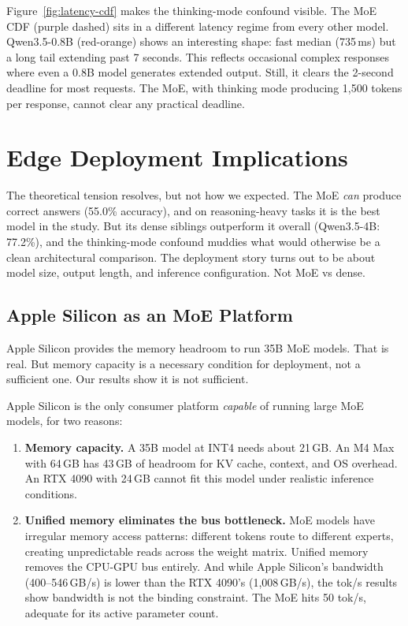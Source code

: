 \documentclass[11pt]{article}
\begin{document}
Figure~\ref{fig:latency-cdf} makes the thinking-mode confound visible.  The MoE CDF (purple dashed) sits in a different latency regime from every other model.  Qwen3.5-0.8B (red-orange) shows an interesting shape: fast median (735\,ms) but a long tail extending past 7 seconds.  This reflects occasional complex responses where even a 0.8B model generates extended output.  Still, it clears the 2-second deadline for most requests.  The MoE, with thinking mode producing 1,500 tokens per response, cannot clear any practical deadline.


\section{Edge Deployment Implications}
\label{sec:edge-implications}

The theoretical tension resolves, but not how we expected.  The MoE \emph{can} produce correct answers (55.0\% accuracy), and on reasoning-heavy tasks it is the best model in the study.  But its dense siblings outperform it overall (Qwen3.5-4B: 77.2\%), and the thinking-mode confound muddies what would otherwise be a clean architectural comparison.  The deployment story turns out to be about model size, output length, and inference configuration.  Not MoE vs dense.

\subsection{Apple Silicon as an MoE Platform}
\label{sec:apple-moe}

Apple Silicon provides the memory headroom to run 35B MoE models.  That is real.  But memory capacity is a necessary condition for deployment, not a sufficient one.  Our results show it is not sufficient.

Apple Silicon is the only consumer platform \emph{capable} of running large MoE models, for two reasons:

\begin{enumerate}[leftmargin=12pt]
    \item \textbf{Memory capacity.} A 35B model at INT4 needs about 21\,GB.  An M4 Max with 64\,GB has 43\,GB of headroom for KV cache, context, and OS overhead.  An RTX 4090 with 24\,GB cannot fit this model under realistic inference conditions.

    \item \textbf{Unified memory eliminates the bus bottleneck.} MoE models have irregular memory access patterns: different tokens route to different experts, creating unpredictable reads across the weight matrix.  Unified memory removes the CPU-GPU bus entirely.  And while Apple Silicon's bandwidth (400--546\,GB/s) is lower than the RTX 4090's (1,008\,GB/s), the tok/s results show bandwidth is not the binding constraint.  The MoE hits 50 tok/s, adequate for its active parameter count.
\end{enumerate}
\end{document}
